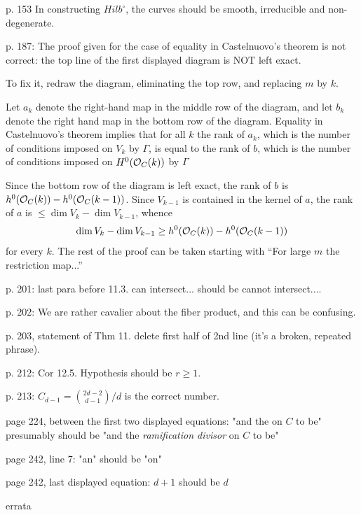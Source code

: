 \documentclass[twoside,12pt, leqno]{amsart}
\begin{document}
p. 153 In constructing $Hilb^\circ$,  the curves should be smooth, irreducible and non-degenerate.


p. 187: The proof given for the case of equality in Castelnuovo's theorem is not correct: the top line of the first displayed diagram is NOT left exact.

To fix it, redraw the diagram, eliminating the top row, and replacing $m$ by $k$.

Let $a_{k}$ denote the right-hand map in the  middle row of the 
diagram, and let $b_{k}$ denote the right hand map in the bottom row of the diagram. Equality in Castelnuovo's theorem implies that for all $k$ the
rank of $a_{k}$, which is the number of conditions imposed
on $V_{k}$ by $\Gamma$, is equal to the rank of $b$, 
which is the number of conditions imposed
on $H^{0}({\mathcal O}_{C}(k))$ by $\Gamma$

Since the bottom row of the diagram is left exact, the rank of $b$
is $h^{0}({\mathcal O}_{C}(k)) - h^{0}({\mathcal O}_{C}(k-1))$. Since $V_{k-1}$
is contained in the kernel of $a$, the 
rank of $a$ is $\leq \dim V_{k} -\dim V_{k-1}$, whence
$$
\dim V_{k} -\dim V_{k-1} \geq  h^{0}({\mathcal O}_{C}(k)) - h^{0}({\mathcal O}_{C}(k-1))
$$
for every $k$. The rest of the proof can be taken starting with
``For large $m$ the restriction map...''

p. 201: last para before 11.3. can intersect... should be cannot intersect....

p. 202: We are rather cavalier about the fiber product, and this can be confusing.

p. 203, statement of Thm 11. delete first half of 2nd line (it's a broken, repeated phrase).

p. 212: Cor 12.5. Hypothesis should be $r\geq 1$.

p. 213: $C_{d-1} = \binom{2d-2}{d-1}/d$ is the correct number.

page 224, between the first two displayed equations: "and the on $C$ to be" presumably should be "and the \emph{ramification divisor} on $C$ to be"

page 242, line 7: "an" should be "on"

page 242, last displayed equation: $d+1$ should be $d$

\begin{bibliography}{errata}
\end{bibliography}

\end{document}
